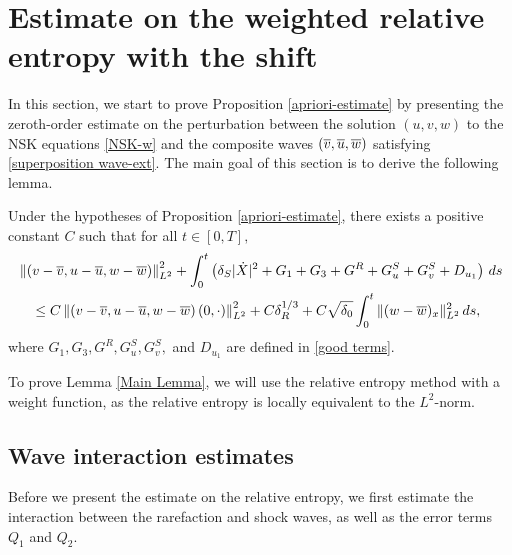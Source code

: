 \documentclass[11pt,reqno]{amsart}
\begin{document}
\section{Estimate on the weighted relative entropy with the shift}\label{sec:rel_ent}
	\setcounter{equation}{0}
	In this section, we start to prove Proposition \ref{apriori-estimate} by presenting the zeroth-order estimate on the perturbation between the solution $(u,v,w)$ to the NSK equations \eqref{NSK-w} and the composite waves $(\overline{v},\overline{u},\overline{w})$ satisfying \eqref{superposition wave-ext}. The main goal of this section is to derive the following lemma.
	
	\begin{lemma} \label{Main Lemma} 
		Under the hypotheses of Proposition \ref{apriori-estimate}, there exists a positive constant $C$ such that for all $t \in [0,T],$
		\begin{equation} \label{energy-est}
		\begin{aligned}
		& \left\| \left( v-\overline{v}, u-\overline{u}, w-\overline{w} \right) \right\|_{L^2}^2  +  \int_0^t \left(\delta_S|\dot{X}|^2 +G_1+ G_3 + G^R + G^S_u+ G^S_v+ D_{u_1}\right)\, ds \\ 
		&\quad \le C \left\| \left( v-\overline{v}, u-\overline{u}, w-\overline{w} \right)(0,\cdot) \right\|_{L^2}^2 +C \delta_R^{1/3} + C\sqrt{\delta_0} \int_0^t \| (w-\overline{w})_x\|_{L^2}^2 \, ds,
		\end{aligned}
		\end{equation}
		where $G_1, G_3, G^R,  G^S_u, G^S_v,$ and $D_{u_1}$ are defined in \eqref{good terms}.
	\end{lemma}

	To prove Lemma \ref{Main Lemma}, we will use the relative entropy method with a weight function, as the relative entropy is locally equivalent to the $L^2$-norm. 
    
\subsection{Wave interaction estimates}
Before we present the estimate on the relative entropy, we first estimate the interaction between the rarefaction and shock waves, as well as the error terms $Q_1$ and $Q_2$.
\end{document}
